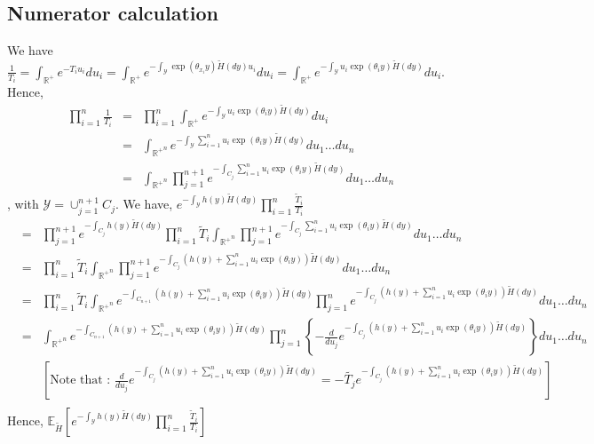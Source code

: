 \documentclass[10pt, oneside]{article}   	%
\renewcommand{\th}{\theta}
\newcommand{\thh}{\widetilde{H}}
\newcommand{\sy}{\mathcal{Y}}
\newcommand{\E}{\mathbb{E}}
\newcommand{\R}{\mathbb{R}}
\renewcommand{\sy}{\mathcal{Y}}
\begin{document}
\subsection{Numerator calculation}
We have $\frac{1}{T_i} = \int_{\R^{+}} e^{-T_i u_i} d u_i =  \int_{\R^{+}} e^{- \int_{\mathcal{Y}} \exp (\th_{x_i} y) \thh(dy) u_i} d u_i =  \int_{\R^{+}} e^{- \int_{\mathcal{Y}} u_i \exp (\th_i y) \thh(dy)} d u_i$. Hence, 
\begin{eqnarray*}
\prod_{i=1}^n \frac{1}{T_i} & = & \prod_{i=1}^n \int_{\R^{+}} e^{- \int_{\mathcal{Y}} u_i \exp (\th_i y) \thh(dy)} d u_i \\
& = & \int_{{\R^{+}}^n} e^{- \int_{\mathcal{Y}}  \sum_{i=1}^n u_i \exp (\th_i y) \thh(dy)} d u_1\dots du_n \\
& =  & \int_{{\R^{+}}^n} \prod_{j=1}^{n+1} e^{- \int_{C_j} \sum_{i=1}^n u_i \exp (\th_i y) \thh(dy)} d u_1\dots du_n
\end{eqnarray*}
, with $\sy = \cup_{j=1}^{n+1} C_j$. We have, $e^{-\int_\sy h(y) \thh(dy)} \prod_{i = 1}^n \frac{\widetilde T_i}{T_i}$
\begin{eqnarray*}
   & = & \prod_{j=1}^{n+1} e^{-\int_{C_j} h(y) \thh(dy)}  \prod_{i=1}^n {\widetilde T_i} \int_{{\R^{+}}^n} \prod_{j=1}^{n+1} e^{- \int_{C_j} \sum_{i=1}^n u_i \exp (\th_i y) \thh(dy)} d u_1\dots du_n \\
   & = & \prod_{i=1}^n {\widetilde T_i} \int_{{\R^{+}}^n} \prod_{j=1}^{n+1} e^{- \int_{C_j} \left(h(y) + \sum_{i=1}^n u_i \exp (\th_i y) \right) \thh(dy)} d u_1\dots du_n \\
  & = &  \prod_{i=1}^n {\widetilde T_i} \int_{{\R^{+}}^n}  e^{- \int_{C_{n+1}} \left(h(y) + \sum_{i=1}^n u_i \exp (\th_i y) \right) \thh(dy)} \prod_{j=1}^{n} e^{- \int_{C_j} \left(h(y) + \sum_{i=1}^n u_i \exp (\th_i y) \right) \thh(dy)} d u_1\dots du_n \\
  & = & \int_{{\R^{+}}^n}  e^{- \int_{C_{n+1}} \left(h(y) + \sum_{i=1}^n u_i \exp (\th_i y) \right) \thh(dy)} \prod_{j=1}^{n} \left\{ - \frac{d}{du_j} e^{- \int_{C_j} \left(h(y) + \sum_{i=1}^n u_i \exp (\th_i y) \right) \thh(dy)} \right\} d u_1\dots du_n \\
  & & \left[\mbox{Note that : } \frac{d}{du_j} e^{- \int_{C_j} \left(h(y) + \sum_{i=1}^n u_i \exp (\th_i y) \right) \thh(dy)} = - \widetilde {T_j} e^{- \int_{C_j} \left(h(y) + \sum_{i=1}^n u_i \exp (\th_i y) \right) \thh(dy)}\right] \\
\end{eqnarray*}
Hence, $\E_{\thh}\left[e^{-\int_\sy h(y) \thh(dy)} \prod_{i = 1}^n \frac{\widetilde T_i}{T_i}\right]$
\end{document}

